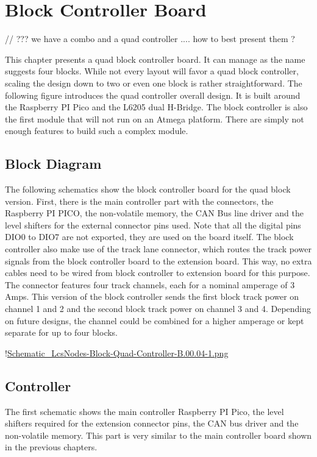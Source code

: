 \chapter{Block Controller Board}


// ??? we have a combo and a quad controller .... how to best present them ?

This chapter presents a quad block controller board. It can manage as the name suggests four blocks. While not every layout will favor a quad block controller, scaling the design down to two or even one block is rather straightforward. The following figure introduces the quad controller overall design. It is built around the Raspberry PI Pico and the L6205 dual H-Bridge. The block controller is also the first module that will not run on an Atmega platform. There are simply not enough features to build such a complex module.

\section{Block Diagram}

The following schematics show the block controller board for the quad block version. First, there is the main controller part with the connectors, the Raspberry PI PICO, the non-volatile memory, the CAN Bus line driver and the level shifters for the external connector pins used. Note that all the digital pins DIO0 to DIO7 are not exported, they are used on the board itself. The block controller also make use of the track lane connector, which routes the track power signals from the block controller board to the extension board. This way, no extra cables need to be wired from block controller to extension board for this purpose. The connector features four track channels, each for a nominal amperage of 3 Amps. This version of the block controller sends the first block track power on channel 1 and 2 and the second block track power on channel 3 and 4. Depending on future designs, the channel could be combined for a higher amperage or kept separate for up to four blocks.

!\href{./Schematics/Schematic_LcsNodes-Block-Quad-Controller-B.00.04-1.png }{Schematic_LcsNodes-Block-Quad-Controller-B.00.04-1.png}

\section{Controller}

The first schematic shows the main controller Raspberry PI Pico, the level shifters required for the extension connector pins, the CAN bus driver and the non-volatile memory. This part is very similar to the main controller board shown in the previous chapters.

